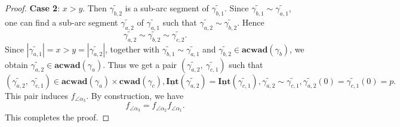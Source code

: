 \documentclass[a4paper,10pt]{amsart}
\theoremstyle{plain}          %
\theoremstyle{definition}
\newcommand{\Intv}{\underline{\mathbf{Int}}}
\newcommand{\aad}{\mathbf{acwad}}
\newcommand{\cad}{\mathbf{cwad}}
\begin{document}
\begin{proof}
\noindent\textbf{Case 2}:  $x>y$. Then $\widetilde{\gamma_{b,2}}$ is a sub-arc segment of  $\widetilde{\gamma_{b,1}}$. Since $\widetilde{\gamma_{b,1}}\sim\widetilde{\gamma_{a,1}}$, one can find a sub-arc segment $\widetilde{\gamma_{a,2}}$ of $\widetilde{\gamma_{a,1}}$ such that $ \widetilde{\gamma_{a,2}}\sim \widetilde{\gamma_{b,2}}$. Hence $$\widetilde{\gamma_{a,2}}\sim \widetilde{\gamma_{b,2}}\sim \widetilde{\gamma_{c,2}}.$$
Since $|\widetilde{\gamma_{a,1}}|=x>y=|\widetilde{\gamma_{a,2}}|$, together with $\widetilde{\gamma_{b,1}}\sim\widetilde{\gamma_{a,1}}$ and 
 $\widetilde{\gamma_{b,2}}\in\aad(\gamma_b)$, we obtain  
 $\widetilde{\gamma_{a,2}}\in \aad(\gamma_a)$. Thus we get a pair $(\widetilde{\gamma_{a,2}},~\widetilde{\gamma_{c,1}})$ such that 
\[(\widetilde{\gamma_{a,2}},~\widetilde{\gamma_{c,1}})\in\aad(\gamma_a)\times\cad(\gamma_c), \Intv(\widetilde{\gamma_{a,2}})=\Intv(\widetilde{\gamma_{c,1}}), \widetilde{\gamma_{a,2}}\sim\widetilde{\gamma_{c,1}},\widetilde{\gamma_{a,2}}(0)=\widetilde{\gamma_{c,1}}(0)=p.\]
This pair induces $f_{\angle\alpha_3}$. By construction, we have $$f_{\angle\alpha_3}=f_{\angle\alpha_2}f_{\angle\alpha_1}.$$ This completes the proof.
 \end{proof}   
\end{document}
